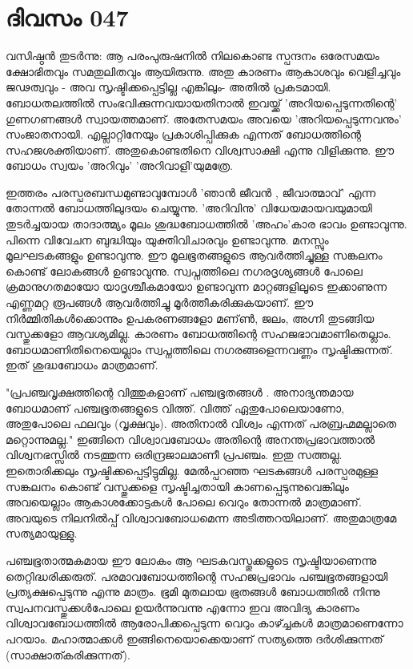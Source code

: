 \newpage
\section{ദിവസം 047}


വസിഷ്ഠന്‍ തുടര്‍ന്നു: ആ പരംപുരുഷനില്‍ നിലകൊണ്ട  സ്പന്ദനം ഒരേസമയം ക്ഷോഭിതവും സമതുലിതവും ആയിരുന്നു. അതു കാരണം ആകാശവും വെളിച്ചവും ജഢത്വവും - അവ സൃഷ്ടിക്കപ്പെട്ടില്ല എങ്കിലും- അതില്‍ പ്രകടമായി. ബോധതലത്തില്‍ സംഭവിക്കുന്നവയായതിനാല്‍ ഇവയ്ക്ക്‌ 'അറിയപ്പെടുന്നതിന്റെ' ഗുണഗണങ്ങള്‍ സ്വായത്തമാണ്‌. അതേസമയം അവയെ 'അറിയപ്പെടുന്നവനും' സംജാതനായി. എല്ലാറ്റിനേയും പ്രകാശിപ്പിക്കുക എന്നത്‌ ബോധത്തിന്റെ സഹജശക്തിയാണ്‌. അതുകൊണ്ടതിനെ വിശ്വസാക്ഷി എന്നു വിളിക്കുന്നു. ഈ ബോധം സ്വയം 'അറിവും' 'അറിവാളി'യുമത്രേ. 

ഇത്തരം പരസ്പരബന്ധമുണ്ടാവുമ്പോള്‍ 'ഞാന്‍ ജീവന്‍ , ജീവാത്മാവ്‌' എന്ന തോന്നല്‍ ബോധത്തിലുദയം ചെയ്യുന്നു. 'അറിവിനു' വിധേയമായവയുമായി തുടര്‍ച്ചയായ താദാത്മ്യം മൂലം ശുദ്ധബോധത്തില്‍ 'അഹം'കാര ഭാവം ഉണ്ടാവുന്നു. പിന്നെ വിവേചന ബുദ്ധിയും യുക്തിവിചാരവും ഉണ്ടാവുന്നു. മനസ്സും മൂലഘടകങ്ങളും ഉണ്ടാവുന്നു. ഈ മൂലഭൂതങ്ങളുടെ ആവര്‍ത്തിച്ചുള്ള സങ്കലനം കൊണ്ട്‌ ലോകങ്ങള്‍ ഉണ്ടാവുന്നു. സ്വപ്നത്തിലെ നഗരദൃശ്യങ്ങള്‍ പോലെ ക്രമാനുഗതമായോ യാദൃശ്ചീകമായോ ഉണ്ടാവുന്ന മാറ്റങ്ങളിലൂടെ ഇക്കാണുന്ന എണ്ണമറ്റ രൂപങ്ങള്‍ ആവര്‍ത്തിച്ചു മൂര്‍ത്തീകരിക്കുകയാണ്‌. ഈ നിര്‍മ്മിതികള്‍ക്കൊന്നും ഉപകരണങ്ങളോ മണ്ണ്‍, ജലം, അഗ്നി തുടങ്ങിയ വസ്തുക്കളോ ആവശ്യമില്ല. കാരണം ബോധത്തിന്റെ സഹജഭാവമാണിതെല്ലാം. ബോധമാണിതിനെയെല്ലാം സ്വപ്നത്തിലെ നഗരങ്ങളെന്നവണ്ണം സൃഷ്ടിക്കുന്നത്‌. ഇത്‌ ശുദ്ധബോധം മാത്രമാണ്‌.

"പ്രപഞ്ചവൃക്ഷത്തിന്റെ വിത്തുകളാണ്‌ പഞ്ചഭൂതങ്ങള്‍ . അനാദ്യന്തമായ ബോധമാണ്‌ പഞ്ചഭൂതങ്ങളുടെ വിത്ത്‌. വിത്ത്‌ ഏതുപോലെയാണോ, അതുപോലെ ഫലവും (വൃക്ഷവും). അതിനാല്‍ വിശ്വം എന്നത്‌ പരബ്രഹ്മമല്ലാതെ മറ്റൊന്നുമല്ല." ഇങ്ങിനെ വിശ്വാവബോധം അതിന്റെ അനന്തപ്രഭാവത്താല്‍ വിശ്വനഭസ്സില്‍ നടത്തുന്ന ഒരിന്ദ്രജാലമാണീ പ്രപഞ്ചം. ഇതു സത്തല്ല. ഇതൊരിക്കലും സൃഷ്ടിക്കപ്പെട്ടിട്ടുമില്ല. മേല്‍പ്പറഞ്ഞ ഘടകങ്ങള്‍ പരസ്പരമുള്ള സങ്കലനം കൊണ്ട്‌ വസ്തുക്കളെ സൃഷ്ടിച്ചതായി കാണപ്പെടുന്നുവെങ്കിലും അവയെല്ലാം ആകാശക്കോട്ടകള്‍ പോലെ വെറും തോന്നല്‍ മാത്രമാണ്‌. അവയുടെ നിലനില്‍പ്പ്‌ വിശ്വാവബോധമെന്ന അടിത്തറയിലാണ്‌. അതുമാത്രമേ സത്യമായുള്ളു. 

പഞ്ചഭൂതാത്മകമായ ഈ ലോകം ആ ഘടകവസ്തുക്കളുടെ സൃഷ്ടിയാണെന്നു തെറ്റിദ്ധരിക്കരുത്‌. പരമാവബോധത്തിന്റെ സഹജപ്രഭാവം പഞ്ചഭൂതങ്ങളായി പ്രത്യക്ഷപ്പെടുന്നു എന്നു മാത്രം. ഭൂമി മുതലായ ഭൂതങ്ങള്‍ ബോധത്തില്‍ നിന്നു സ്വപനവസ്തുക്കള്‍പോലെ ഉയര്‍ന്നുവന്നു എന്നോ ഇവ അവിദ്യ കാരണം വിശ്വാവബോധത്തില്‍ ആരോപിക്കപ്പെടുന്ന വെറും കാഴ്ച്ചകള്‍ മാത്രമാണെന്നോ പറയാം. മഹാത്മാക്കള്‍ ഇങ്ങിനെയൊക്കെയാണ്‌ സത്യത്തെ ദര്‍ശിക്കുന്നത്‌ (സാക്ഷാത്കരിക്കുന്നത്‌).
